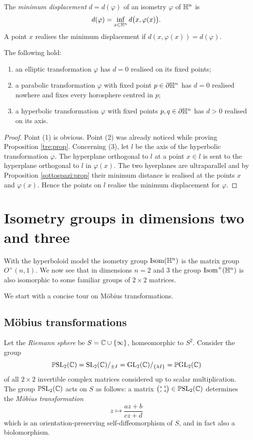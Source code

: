 The \emph{minimum displacement} $d=d(\varphi)$ of an isometry $\varphi$ of $\mathbb{H}^n$ is 
$$d(\varphi) = \inf_{x\in\mathbb{H}^n} d\big(x,\varphi(x)\big).$$
A point $x$ realises the minimum displacement if $d(x,\varphi(x)) = d(\varphi)$.
\begin{cor} \label{spostamento:cor}
The following hold:
\begin{enumerate}
\item an elliptic transformation $\varphi$ has $d=0$ realised on its fixed points;
\item a parabolic transformation $\varphi$ with fixed point $p\in \partial\mathbb{H}^n$ has $d=0$ realised nowhere and fixes every horosphere centred in $p$; 
\item a hyperbolic transformation $\varphi$ with fixed points $p,q\in\partial\mathbb{H}^n$ has $d>0$ realised on its axis.
\end{enumerate}
\end{cor}
\begin{proof}
Point (1) is obvious. Point (2) was already noticed while proving Proposition \ref{tre:prop}. Concerning (3), let $l$ be the axis of the hyperbolic transformation $\varphi$. The hyperplane orthogonal to $l$ at a point $x\in l$ is sent to the hyperplane orthogonal to $l$ in $\varphi(x)$. The two hyerplanes are ultraparallel and by Proposition \ref{sottospazi:prop} their minimum distance is realised at the points $x$ and $\varphi(x)$. Hence the points on $l$ realise the minimum displacement for $\varphi$.
\end{proof}

\section{Isometry groups in dimensions two and three} \label{isometry:2:3:section}
With the hyperboloid model the isometry group ${\rm Isom}(\mathbb{H}^n)$ is the matrix group $O^+(n,1)$. We now see that in dimensions $n=2$ and $3$ the group ${\rm Isom}^+(\mathbb{H}^n)$ is also isomorphic to some familiar groups of $2\times 2$ matrices. 

We start with a concise tour on M\"obius transformations. 

\subsection{M\"obius transformations}
Let the \emph{Riemann sphere} be $S=\mathbb{C} \cup \{\infty\}$, homeomorphic to $S^2$. Consider the group
$$ \mathbb{P}{\rm SL}_2(\mathbb{C}) = {\rm SL}_2(\mathbb{C})/_{\pm I} = {\rm GL}_2(\mathbb{C})/_{\{ \lambda I\}} = \mathbb{P}{\rm GL}_2(\mathbb{C}) $$
of all $2\times 2$ invertible complex matrices considered up to scalar multiplication. The group $\mathbb{P}{\rm SL}_2(\mathbb{C})$ acts on $S$ as follows: a matrix $\matr abcd \in \PSLC$ determines the \emph{M\"obius transformation} 
$$z \mapsto \frac{az+b}{cz+d}$$
which is an orientation-preserving self-diffeomorphism of $S$, and in fact also a  biolomorphism.

